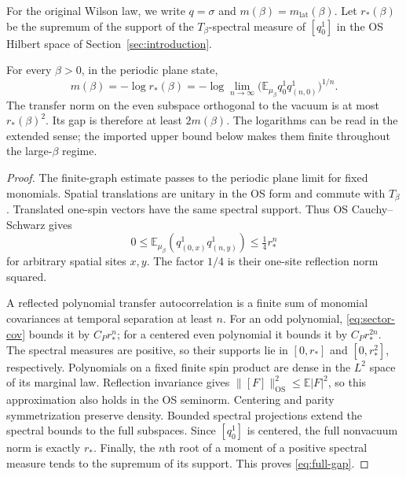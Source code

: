 For the original Wilson law, we write $q=\sigma$ and
$m(\beta)=m_{\mathrm{lat}}(\beta)$. Let $r_*(\beta)$ be the
supremum of the support of the $T_\beta$-spectral measure of
$[q_0^1]$ in the OS Hilbert space of Section~\ref{sec:introduction}.

\begin{proposition}
\label{prop:wilson-full-gap}
For every $\beta>0$, in the periodic plane state,
\begin{equation}
 m(\beta)=-\log r_*(\beta)
 =-\log\lim_{n\to\infty}
       \bigl(\mathbb E_{\mu_\beta}q_0^1q_{(n,0)}^1\bigr)^{1/n}.
 \label{eq:full-gap}
\end{equation}
The transfer norm on the even subspace orthogonal to the vacuum
is at most $r_*(\beta)^2$. Its gap is therefore at least
$2m(\beta)$. The logarithms can be read in the extended sense;
the imported upper bound below makes them finite throughout
the large-$\beta$ regime.
\end{proposition}

\begin{proof}
The finite-graph estimate passes to the periodic plane limit
for fixed monomials. Spatial translations are unitary in the
OS form and commute with $T_\beta$. Translated one-spin vectors
have the same spectral support. Thus OS Cauchy--Schwarz gives
\[
 0\le\mathbb E_{\mu_\beta}
       (q_{(0,x)}^1q_{(n,y)}^1)\le\tfrac14r_*^n
\]
for arbitrary spatial sites $x,y$. The factor $1/4$ is their
one-site reflection norm squared.

A reflected polynomial transfer autocorrelation is a finite
sum of monomial covariances at temporal separation at least
$n$. For an odd polynomial, \eqref{eq:sector-cov} bounds it by
$C_P r_*^n$; for a centered even polynomial it bounds it by
$C_P r_*^{2n}$. The spectral measures are positive, so their
supports lie in $[0,r_*]$ and $[0,r_*^2]$, respectively.
Polynomials on a fixed finite spin product are dense in the
$L^2$ space of its marginal law. Reflection invariance gives
$\|[F]\|_{\mathrm{OS}}^2\le\mathbb E|F|^2$, so this approximation
also holds in the OS seminorm. Centering and parity
symmetrization preserve density. Bounded spectral projections
extend the spectral bounds to the full subspaces.
Since $[q_0^1]$ is centered, the full nonvacuum norm is exactly
$r_*$. Finally, the $n$th root of a moment of a positive
spectral measure tends to the supremum of its support.
This proves \eqref{eq:full-gap}.
\end{proof}

